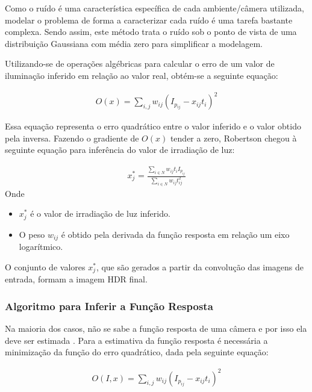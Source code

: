 Como o ruído é uma característica específica de cada ambiente/câmera utilizada, modelar o problema de forma a caracterizar cada ruído é uma tarefa bastante complexa. Sendo assim, este método trata o ruído sob o ponto de vista de uma distribuição Gaussiana com média zero para simplificar a modelagem.

Utilizando-se de operações algébricas para calcular o erro de um valor de iluminação inferido em relação ao valor real, obtém-se a seguinte equação:

\begin{align} \label{eqRobertsonErr}
	O(x) = \sum\limits_{i,j}{w_{ij}(I_{p_{ij}} - x_{ij}t_{i})^2}
\end{align}

Essa equação representa o erro quadrático entre o valor inferido e o valor obtido pela inversa. Fazendo o gradiente de $O(x)$ tender a zero, Robertson chegou à seguinte equação para inferência do valor de irradiação de luz:

\begin{align} \label{eqRobertsonGeracao}
	x^{*}_j = \frac{\sum\limits_{i \in N}{w_{ij}t_{i}I_{p_{ij}}}}{\sum\limits_{i \in N}{w_{ij}t_{ij}^{2}}}
\end{align}
Onde
\begin{itemize}
\item $x^{*}_j$ é o valor de irradiação de luz inferido.
\item O peso $w_{ij}$ é obtido pela derivada da função resposta em relação um eixo logarítmico. 
\end{itemize}

O conjunto de valores $x^{*}_j$, que são gerados a partir da convolução das imagens de entrada, formam a imagem HDR final.

\subsubsection{Algoritmo para Inferir a Função Resposta} \label{metodoRobertsonAlg}

Na maioria dos casos, não se sabe a função resposta de uma câmera e por isso ela deve ser estimada \cite{robertson}. Para a estimativa da função resposta é necessária a minimização da função do erro quadrático, dada pela seguinte equação:

\begin{align} \label{eqRobertsonErr2}
	O(I,x) = \sum\limits_{i,j}{w_{ij}(I_{p_{ij}} - x_{ij}t_{i})^2}
\end{align}

